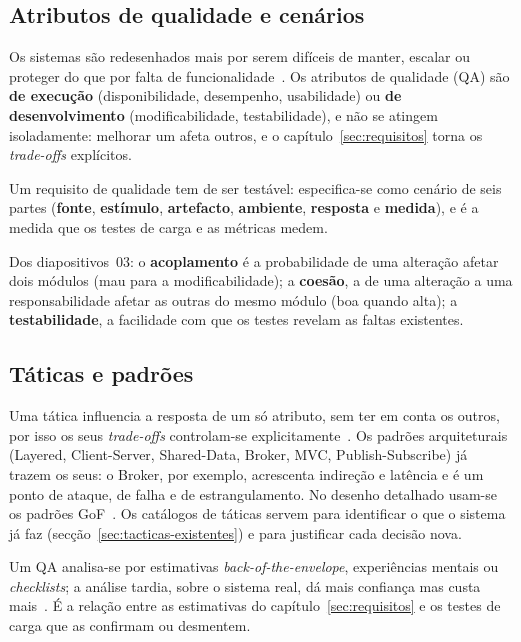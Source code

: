 \subsection{Atributos de qualidade e cenários}

Os sistemas são redesenhados mais por serem difíceis de manter, escalar ou proteger do que por falta de
funcionalidade~\cite{bastofernandes2026}. Os atributos de qualidade (QA) são \textbf{de execução} (disponibilidade,
desempenho, usabilidade) ou \textbf{de desenvolvimento} (modificabilidade, testabilidade), e não se atingem
isoladamente: melhorar um afeta outros, e o capítulo~\ref{sec:requisitos} torna os \emph{trade-offs} explícitos.

Um requisito de qualidade tem de ser testável: especifica-se como cenário de seis partes (\textbf{fonte},
\textbf{estímulo}, \textbf{artefacto}, \textbf{ambiente}, \textbf{resposta} e \textbf{medida}), e é a medida que
os testes de carga e as métricas medem.

Dos diapositivos~03: o \textbf{acoplamento} é a probabilidade de uma alteração afetar dois módulos (mau para a
modificabilidade); a \textbf{coesão}, a de uma alteração a uma responsabilidade afetar as outras do mesmo módulo
(boa quando alta); a \textbf{testabilidade}, a facilidade com que os testes revelam as faltas existentes.

\subsection{Táticas e padrões}

Uma tática influencia a resposta de um só atributo, sem ter em conta os outros, por isso os seus
\emph{trade-offs} controlam-se explicitamente~\cite{bastofernandes2026}. Os padrões arquiteturais (Layered,
Client-Server, Shared-Data, Broker, MVC, Publish-Subscribe) já trazem os seus: o Broker, por exemplo, acrescenta
indireção e latência e é um ponto de ataque, de falha e de estrangulamento. No desenho detalhado usam-se os padrões
GoF~\cite{gamma1994}. Os catálogos de táticas servem para identificar o que o sistema já faz
(secção~\ref{sec:tacticas-existentes}) e para justificar cada decisão nova.

Um QA analisa-se por estimativas \emph{back-of-the-envelope}, experiências mentais ou \emph{checklists}; a análise
tardia, sobre o sistema real, dá mais confiança mas custa mais~\cite{bastofernandes2026}. É a relação entre as
estimativas do capítulo~\ref{sec:requisitos} e os testes de carga que as confirmam ou desmentem.

